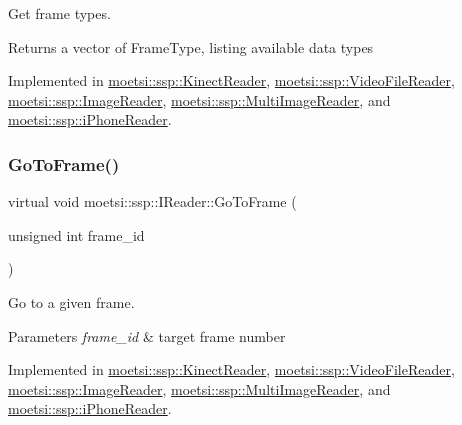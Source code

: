 Get frame types. 

\begin{DoxyReturn}{Returns}
a vector of Frame\+Type, listing available data types 
\end{DoxyReturn}


Implemented in \hyperlink{classmoetsi_1_1ssp_1_1KinectReader_aef896aa686cbe1ea82dfc6aad46b6ff7}{moetsi\+::ssp\+::\+Kinect\+Reader}, \hyperlink{classmoetsi_1_1ssp_1_1VideoFileReader_a9d47af47299c5fccf766ac2d848a561b}{moetsi\+::ssp\+::\+Video\+File\+Reader}, \hyperlink{classmoetsi_1_1ssp_1_1ImageReader_af6f66957b6e3268c5336f4176c77fc73}{moetsi\+::ssp\+::\+Image\+Reader}, \hyperlink{classmoetsi_1_1ssp_1_1MultiImageReader_ad5f6cf0cfb1e64bcf569ab0bbfcce9d6}{moetsi\+::ssp\+::\+Multi\+Image\+Reader}, and \hyperlink{classmoetsi_1_1ssp_1_1iPhoneReader_a05d285ace85fc570bc2f453a0862ae56}{moetsi\+::ssp\+::i\+Phone\+Reader}.

\mbox{\label{classmoetsi_1_1ssp_1_1IReader_a6f1be3c06538992cca6d550bd9566681}} 
\subsubsection{\texorpdfstring{Go\+To\+Frame()}{GoToFrame()}\hspace{0.1cm}{\footnotesize\ttfamily [1/2]}}
{\footnotesize\ttfamily virtual void moetsi\+::ssp\+::\+I\+Reader\+::\+Go\+To\+Frame (\begin{DoxyParamCaption}\item[{unsigned int}]{frame\+\_\+id }\end{DoxyParamCaption})\hspace{0.3cm}{\ttfamily [pure virtual]}}



Go to a given frame. 


\begin{DoxyParams}{Parameters}
{\em frame\+\_\+id} & target frame number \\
\hline
\end{DoxyParams}


Implemented in \hyperlink{classmoetsi_1_1ssp_1_1KinectReader_a315690c46e153a35d4ded1189e93af08}{moetsi\+::ssp\+::\+Kinect\+Reader}, \hyperlink{classmoetsi_1_1ssp_1_1VideoFileReader_ad98a532db8b1e2c3879df274b2efb082}{moetsi\+::ssp\+::\+Video\+File\+Reader}, \hyperlink{classmoetsi_1_1ssp_1_1ImageReader_a32eb88cc612e6920f4910e0803b0ce3c}{moetsi\+::ssp\+::\+Image\+Reader}, \hyperlink{classmoetsi_1_1ssp_1_1MultiImageReader_a7c552a1ad469660ea0a88b9ca85138ad}{moetsi\+::ssp\+::\+Multi\+Image\+Reader}, and \hyperlink{classmoetsi_1_1ssp_1_1iPhoneReader_a27b6dea97e4c4db8e4e749cc9e30e7ca}{moetsi\+::ssp\+::i\+Phone\+Reader}.

